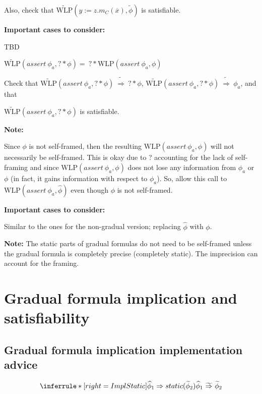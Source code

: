 \documentclass {article}
\newcommand{\fphi}{\widehat{\phi}}
\newcommand{\tphi}{\widetilde{\phi}}
\newcommand{\imp}{\Rightarrow}
\newcommand{\timp}{\ \widetilde{\Rightarrow}\ }
\newcommand{\wlp}[2]{\text{WLP}(#1,#2)}
\newcommand{\twlp}[2]{\widetilde{\text{WLP}}(#1,#2)}
\begin{document}
Also, check that
$\twlp{y := z.m_C(\overline{x})}{\tphi}$ is satisfiable.

\textbf{Important cases to consider:}

TBD

\vspace{0.5cm}

$\twlp{assert\ \phi_a}{? \ast \phi} = \ ? \ast \wlp{assert\ \phi_a}{\phi}$

Check that $\twlp{assert\ \phi_a}{? \ast \phi} \timp ? \ast \phi$, $\twlp{assert\ \phi_a}{? \ast \phi} \timp \phi_a$, and that 

\noindent $\twlp{assert\ \phi_a}{? \ast \phi}$ is satisfiable.

\textbf{Note:}

Since $\phi$ is not self-framed, then the resulting $\wlp{assert\ \phi_a}{\phi}$ will not necessarily be self-framed. This is okay due to ? accounting for the lack of self-framing and since $\wlp{assert\ \phi_a}{\phi}$ does not lose any information from $\phi_a$ or $\phi$ (in fact, it gains information with respect to $\phi_a$). So, allow this call to $\wlp{assert\ \phi_a}{\fphi}$ even though $\phi$ is not self-framed.

\textbf{Important cases to consider:}

Similar to the ones for the non-gradual version; replacing $\fphi$ with $\phi$.

\vspace{0.5cm}
%
%
%
%

\textbf{Note:} The static parts of gradual formulas do not need to be self-framed unless the gradual formula is completely precise (completely static). The imprecision can account for the framing.

\section{Gradual formula implication and satisfiability}

\subsection{Gradual formula implication implementation advice}

\[ \inferrule*[right=ImplStatic]
   {\fphi_1 \imp static(\tphi_2) }
   {\fphi_1 \timp \tphi_2}
\]
\end{document}
